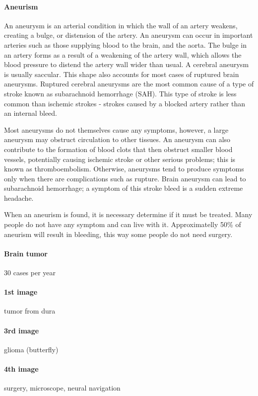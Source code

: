 \documentclass[12pt,article,oneside,a4paper]{memoir}
\begin{document}
\paragraph{Aneurism}
An aneurysm is an arterial condition in which the wall of an artery weakens,
creating a bulge, or distension of the artery. An aneurysm can occur in important
arteries such as those supplying blood to the brain, and the aorta. The bulge
in an artery forms as a result of a weakening of the artery wall, which allows
the blood pressure to distend the artery wall wider than usual. A cerebral
aneurysm is usually saccular. This shape also accounts for most cases of ruptured
brain aneurysms. Ruptured cerebral aneurysms are the most common cause of a type
of stroke known as subarachnoid hemorrhage (SAH). This type of stroke is less
common than ischemic strokes - strokes caused by a blocked artery rather than
an internal bleed.

Most aneurysms do not themselves cause any symptoms, however, a large aneurysm
may obstruct circulation to other tissues. An aneurysm can also contribute to
the formation of blood clots that then obstruct smaller blood vessels,
potentially causing ischemic stroke or other serious problems; this is known as
thromboembolism. Otherwise, aneurysms tend to produce symptoms only when there
are complications such as rupture. Brain aneurysm can lead to subarachnoid
hemorrhage; a symptom of this stroke bleed is a sudden extreme headache.

When an aneurism is found, it is necessary determine if it must be treated.
Many people do not have any symptom and can live with it. Approximatelly 50\% of
aneurism will result in bleeding, this way some people do not need surgery.

\paragraph{Brain tumor} 30 cases per year
\paragraph{1st image} tumor from dura
\paragraph{3rd image} glioma (butterfly)
\paragraph{4th image} surgery, microscope, neural navigation
\end{document}

